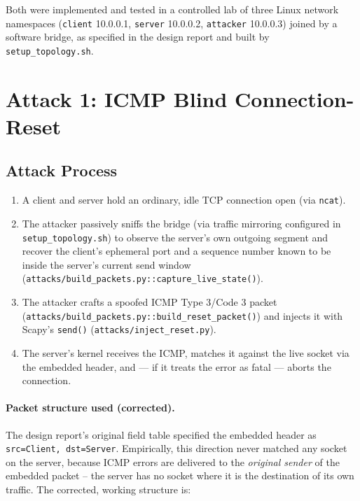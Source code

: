 \documentclass[11pt]{article}
\begin{document}
Both were implemented and tested in a controlled lab of three Linux
network namespaces (\texttt{client} 10.0.0.1, \texttt{server} 10.0.0.2,
\texttt{attacker} 10.0.0.3) joined by a software bridge, as specified in
the design report and built by \texttt{setup\_topology.sh}.

\section{Attack 1: ICMP Blind Connection-Reset}

\subsection{Attack Process}

\begin{enumerate}
    \item A client and server hold an ordinary, idle TCP connection open
    (via \texttt{ncat}).
    \item The attacker passively sniffs the bridge (via traffic
    mirroring configured in \texttt{setup\_topology.sh}) to observe the
    server's own outgoing segment and recover the client's ephemeral
    port and a sequence number known to be inside the server's current
    send window (\texttt{attacks/build\_packets.py::capture\_live\_state()}).
    \item The attacker crafts a spoofed ICMP Type 3/Code 3 packet
    (\texttt{attacks/build\_packets.py::build\_reset\_packet()}) and
    injects it with Scapy's \texttt{send()}
    (\texttt{attacks/inject\_reset.py}).
    \item The server's kernel receives the ICMP, matches it against the
    live socket via the embedded header, and --- if it treats the error
    as fatal --- aborts the connection.
\end{enumerate}

\paragraph{Packet structure used (corrected).} The design report's
original field table specified the embedded header as
\texttt{src=Client, dst=Server}. Empirically, this direction never
matched any socket on the server, because ICMP errors are delivered to
the \emph{original sender} of the embedded packet -- the server has no
socket where it is the destination of its own traffic. The corrected,
working structure is:
\end{document}
